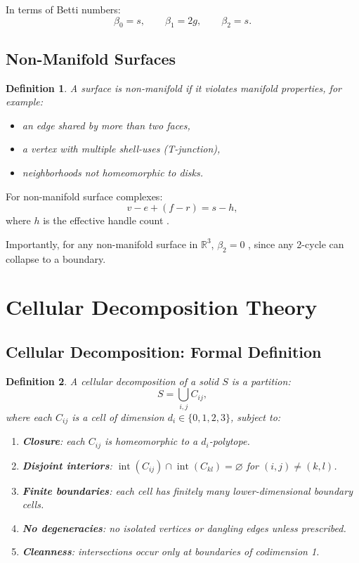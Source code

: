 \documentclass[conference]{IEEEtran}
\newtheorem{definition}{Definition}
\begin{document}
In terms of Betti numbers:
\[
\beta_0 = s,\qquad \beta_1 = 2g,\qquad \beta_2 = s.
\]

\subsection{Non-Manifold Surfaces}

\begin{definition}
A surface is non-manifold if it violates manifold properties, for example:
\begin{itemize}
    \item an edge shared by more than two faces,
    \item a vertex with multiple shell-uses (T-junction),
    \item neighborhoods not homeomorphic to disks.
\end{itemize}
\end{definition}

For non-manifold surface complexes:
\[
v - e + (f - r) = s - h,
\]
where $h$ is the effective handle count \cite{Sequin2015}.

Importantly, for any non-manifold surface in $\mathbb{R}^3$, $\beta_2 = 0$ \cite{Woo2003}, since any 2-cycle can collapse to a boundary.

\section{Cellular Decomposition Theory}

\subsection{Cellular Decomposition: Formal Definition}

\begin{definition}
A cellular decomposition of a solid $S$ is a partition:
\[
S = \bigcup_{i,j} C_{ij},
\]
where each $C_{ij}$ is a cell of dimension $d_i \in \{0,1,2,3\}$, subject to:
\begin{enumerate}
    \item \textbf{Closure}: each $C_{ij}$ is homeomorphic to a $d_i$-polytope.
    \item \textbf{Disjoint interiors}: $\operatorname{int}(C_{ij}) \cap \operatorname{int}(C_{kl}) = \varnothing$ for $(i,j)\neq(k,l)$.
    \item \textbf{Finite boundaries}: each cell has finitely many lower-dimensional boundary cells.
    \item \textbf{No degeneracies}: no isolated vertices or dangling edges unless prescribed.
    \item \textbf{Cleanness}: intersections occur only at boundaries of codimension 1.
\end{enumerate}
\end{definition}
\end{document}
